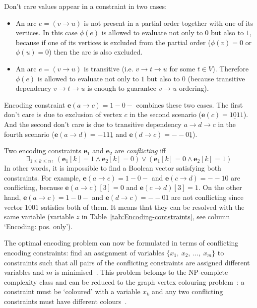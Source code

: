 Don't care values appear in a constraint in two cases:
\begin{itemize}
\item An arc $e=(v\rightarrow u)$ is not present in a partial order together
with one of its vertices. In this case $\phi(e)$ is allowed to evaluate
not only to $0$ but also to $1$, because if one of its vertices
is excluded from the partial order ($\phi(v)=0$ or $\phi(u)=0$)
then the arc is also excluded.
\item An arc $e=(v\rightarrow u)$ is transitive (i.e. $v\rightarrow t\rightarrow u$
for some $t\in V$). Therefore $\phi(e)$ is allowed to evaluate not
only to $1$ but also to $0$ (because transitive dependency $v\rightarrow t\rightarrow u$
is enough to guarantee $v\rightarrow u$ ordering).
\end{itemize}
Encoding constraint $\mathbf{e}(a\rightarrow c)=1\!-\!0-$ combines
these two cases. The first don't care is due to exclusion of vertex
$c$ in the second scenario ($\mathbf{e}(c)=1\underline{0}11$). And
the second don't care is due to transitive dependency $a\rightarrow d\rightarrow c$
in the fourth scenario ($\mathbf{e}(a\rightarrow d)=-11\underline{1}$
and $\mathbf{e}(d\rightarrow c)=-\!-0\underline{1}$).

Two encoding constraints $\mathbf{e}_{1}$ and $\mathbf{e}_{2}$ are
\emph{conflicting} iff
\[
\exists_{1\le k\le n},\ (\mathbf{e}_{1}[k]=1\wedge\mathbf{e}_{2}[k]=0)\vee(\mathbf{e}_{1}[k]=0\wedge\mathbf{e}_{2}[k]=1)
\]
In other words, it is impossible to find a Boolean vector satisfying
both constraints. For example, $\mathbf{e}(a\rightarrow c)=1\!-\!0-$
and $\mathbf{e}(c\rightarrow d)=-\!-\!10$ are conflicting, because
$\mathbf{e}(a\rightarrow c)[3]=0$ and $\mathbf{e}(c\rightarrow d)[3]=1$.
On the other hand, $\mathbf{e}(a\rightarrow c)=1\!-\!0-$ and $\mathbf{e}(d\rightarrow c)=-\!-\!01$
are not conflicting since vector $1001$ satisfies both of them. It
means that they can be resolved with the same variable (variable $z$
in Table~\ref{tab:Encoding-contstraints}, see column `Encoding:
pos. only').

The optimal encoding problem can now be formulated in terms of conflicting
encoding constraints: find an assignment of variables $\{x_{1},\ x_{2},\ \dots,\ x_{m}\}$
to constraints such that all pairs of the conflicting constraints
are assigned different variables and $m$ is minimised~\cite{2009_mokhov_phd}.
This problem belongs to the NP-complete complexity class and can be
reduced to the graph vertex colouring problem~\cite{2001_cormen_mit}:
a constraint must be `coloured' with a variable $x_{k}$ and any
two conflicting constraints must have different colours~\cite{2009_mokhov_phd}.

